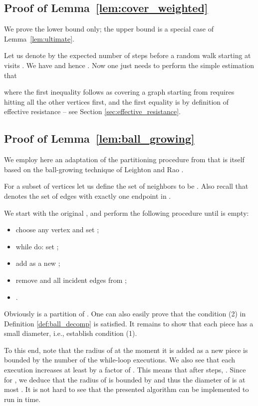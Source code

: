 \documentclass[11pt, letterpaper]{article}
\begin{document}
\subsection{Proof of Lemma~\ref{lem:cover_weighted}}\label{app:cover_weighted}

We prove the lower bound only; the upper bound is a special case of Lemma~\ref{lem:ultimate}.

Let us denote by  the expected number of steps before a random walk starting at  visits . We have  and hence . Now one just needs to perform the simple estimation that

where the first inequality follows as covering a graph  starting from  requires hitting all the other vertices first, and the first equality is by definition of effective resistance -- see Section \ref{sec:effective_resistance}.

\subsection{Proof of Lemma~\ref{lem:ball_growing}}\label{app:ball_growing}

We employ here an adaptation of the partitioning procedure from \cite{KelnerM09} that is itself based on the ball-growing technique of Leighton and Rao \cite{LeightonR99}. 

For a subset of vertices  let us define the set of neighbors  to be . Also recall that  denotes the set of edges with exactly one endpoint in .

We start with the original ,  and perform the following procedure until  is empty:
\begin{itemize}\addtolength{\itemsep}{-.5\baselineskip}
	\item choose any vertex  and set ;
	\item while  do: set ;
	\item add  as a new ;
	\item remove  and all incident edges from ;
	\item .
\end{itemize}
Obviously  is a partition of . One can also easily prove that the condition (2) in Definition \ref{def:ball_decomp} is satisfied.  It remains to show that each piece has a small diameter, i.e., establish condition (1). 

To this end, note that the radius of  at the moment it is added as a new piece is bounded by the number of the while-loop executions. We also see that each execution increases  at least by a factor of . This means that after  steps, . Since  for , we deduce that the radius of  is bounded by  and thus the diameter of  is at most . It is not hard to see that the presented algorithm can be implemented to run in  time.
\end{document}
